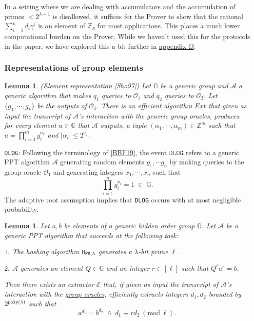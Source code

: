 \documentclass[11pt, lettersize, notitlepage, leqno, footskip=0.6cm]{article}
\newcommand{\bz}{\mathbb Z}
\newcommand{\pl}{\prod\limits}
\newcommand{\ttt}{\texttt}
\newcommand{\bG}{\mathbb{G}}
\newcommand{\mc}{\mathcal}
\newcommand{\mb}{\mathbb}
\newcommand{\al}{\alpha}
\newcommand{\lam}{\lambda}
\newcommand{\bzs}{\bz_{\mc{S}}}
\newcommand{\A}{\mc{A}}
\newcommand{\vs}{\vspace{-0.15cm}}
\newcommand{\noin}{\noindent}
\newcommand{\Mod}[1]{\ (\mathrm{mod}\ #1)}
\newcommand{\E}{\mc{E}}
\newtheorem{Lem}[Thm]{Lemma}
\numberwithin{equation}{section}
\begin{document}
In a setting where we are dealing with accumulators and the accumulation of primes $< 2^{\lam-1}$ is disallowed, it suffices for the Prover to show that the rational $\sum_{i=1}^n d_i{\gamma^i}$ is an element of $\bzs$ for most applications. This places a much lower computational burden on the Prover. While we haven't used this for the protocols in the paper, we have explored this a bit further in \hyperlink{shortcut}{appendix D}.


\subsubsection{\fontsize{11}{11}\selectfont Representations of group elements  }


\begin{Lem} {\normalfont (Element representation \hyperlink{Sho97}{[Sho97]})} Let $\bG$ be a generic group and $\A$ a generic algorithm that makes $q_1$ queries to $\mc{O}_1$ and $q_2$ queries to $\mc{O}_2$. Let $\{g_1,\cdots,g_k \}$ be the outputs of $\mc{O}_1$. There is an efficient algorithm $Ext$ that given as input the transcript of $\A$'s interaction with the generic group oracles, produces for every element $u\in \bG$ that $\A$ outputs, a tuple $(\al_1,\cdots,\al_m)\in \bz^m$ such that $u = \prod_{i=1}^m g_i^{\al_i}$ and $|\al_i| \leq 2^{q_2} $. \end{Lem}


\noin \hypertarget{DLOG}{\ttt{DLOG}}: Following the terminology of \hyperlink{BBF19}{[BBF19]}, {the event $\ttt{DLOG}$} refers to a generic PPT algorithm $\mc{A}$ generating random elements $g_1,\cdots g_n$ by making queries to the group oracle $\mc{O}_1$ and generating integers $x_1,\cdots,x_n$ such that \vs $$\pl_{i=1}^n g_i^{x_i} = 1\;\in\;\bG .$$ The adaptive root assumption implies that \verb|DLOG| occurs with at most negligible probability.


\begin{Lem}\label{root} Let $a, b$ be elements of a generic hidden order group $\bG$. Let $\mc{A}$ be a generic PPT algorithm that succeeds at the following task:

\noin $1.$ The hashing algorithm ${\tt{H}}_{{\tt{FS}},\lam}$ generates a $\lam$-bit prime $\ell$.

\noin $2.$ $\mc{A}$ generates an element $Q\in \mb{G}$ and an integer $r\in [\ell]$ such that $Q^{\ell}a^r = b$.

\noin Then there exists an extractor \hspace{0.05cm}$\E$ that, if given as input the transcript of $\A$'s interaction with the \hyperlink{Oracles}{group oracles}, efficiently extracts integers $d_1,d_2$ bounded by $2^{\tt{poly}(\lam)}$ such that \vs $$a^{d_1} = b^{d_2}\;\wedge\;d_1\equiv rd_2\Mod{\ell}.$$\end{Lem}
\end{document}
